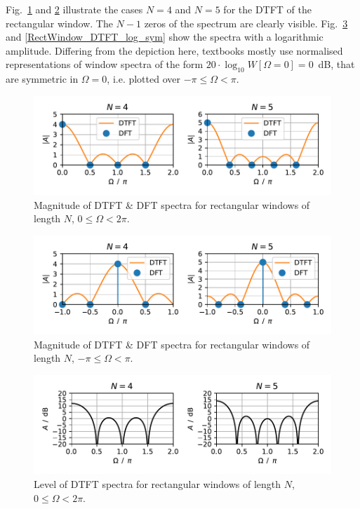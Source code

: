 \documentclass[11pt,a4paper,DIV=12]{scrartcl}
\begin{document}
Fig.~\ref{RectWindow_DTFT_DFT_lin_asym} and \ref{RectWindow_DTFT_DFT_lin_sym}
illustrate the cases $N=4$ and $N=5$ for the DTFT of the rectangular window.
%
The $N-1$ zeros of the spectrum are clearly visible.
%
Fig.~\ref{RectWindow_DTFT_log_asym} and \ref{RectWindow_DTFT_log_sym} show the
spectra with a logarithmic amplitude.
%
Differing from the depiction here, textbooks mostly use normalised representations
of window spectra of the form $20\cdot\log_{10}W[\Omega=0]=0$~dB, that are
symmetric in $\Omega=0$, i.e. plotted over $-\pi\leq\Omega<\pi$.
%
\begin{figure}
		\centering
		\includegraphics[]{graphics/RectWindow_DTFT_DFT_lin_asym.pdf}
		\caption{Magnitude of DTFT \& DFT spectra for rectangular windows of length
		$N$, $0\leq\Omega<2\pi$.}
		\label{RectWindow_DTFT_DFT_lin_asym}
\end{figure}
\begin{figure}
		\centering
		\includegraphics[]{graphics/RectWindow_DTFT_DFT_lin_sym.pdf}
		\caption{Magnitude of DTFT \& DFT spectra for rectangular windows of length
		$N$, $-\pi\leq\Omega<\pi$.}
		\label{RectWindow_DTFT_DFT_lin_sym}
\end{figure}
\begin{figure}
		\centering
		\includegraphics[]{graphics/RectWindow_DTFT_DFT_log_asym.pdf}
		\caption{Level of DTFT spectra for rectangular windows of length $N$,
		$0\leq\Omega<2\pi$.}
		\label{RectWindow_DTFT_log_asym}
\end{figure}
\end{document}
